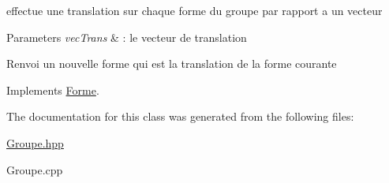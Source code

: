 effectue une translation sur chaque forme du groupe par rapport a un vecteur 


\begin{DoxyParams}{Parameters}
{\em vec\+Trans} & \+: le vecteur de translation\\
\hline
\end{DoxyParams}
Renvoi un nouvelle forme qui est la translation de la forme courante 

Implements \mbox{\hyperlink{class_forme}{Forme}}.



The documentation for this class was generated from the following files\+:\begin{DoxyCompactItemize}
\item 
\mbox{\hyperlink{_groupe_8hpp}{Groupe.\+hpp}}\item 
Groupe.\+cpp\end{DoxyCompactItemize}
